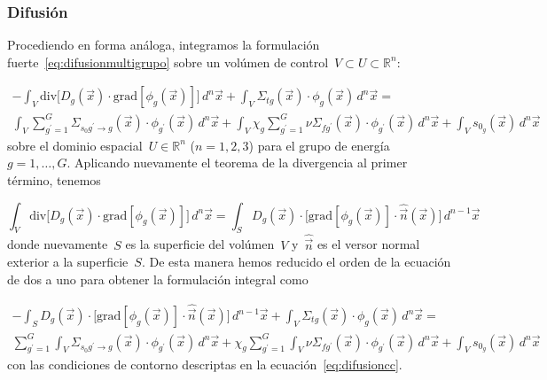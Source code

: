 \subsubsection{Difusión} %

Procediendo en forma análoga, integramos la formulación fuerte~\eqref{eq:difusionmultigrupo} sobre un volúmen de control~$V \subset U \subset \mathbb{R}^n$:

\begin{multline*}
 - \int_V \text{div} \Big[ D_g(\vec{x}) \cdot \text{grad} \left[ \phi_g(\vec{x}) \right] \Big] \, d^n \vec{x}
 + \int_V \Sigma_{t g}(\vec{x}) \cdot \phi_g(\vec{x}) \, d^n \vec{x}
 = \\
 \int_V \sum_{g^\prime = 1}^G \Sigma_{s_0 g^\prime \rightarrow g}(\vec{x})  \cdot \phi_{g^\prime}(\vec{x}) \, d^n \vec{x}
+
 \int_V \chi_g \sum_{g^\prime = 1}^G \nu\Sigma_{fg^\prime}(\vec{x}) \cdot \phi_{g^\prime}(\vec{x}) \, d^n \vec{x}
 +
\int_V s_{0_g}(\vec{x}) \, d^n \vec{x}
\end{multline*}
%
sobre el dominio espacial~$U \in \mathbb{R}^n$ ($n=1,2,3$) para el grupo de energía~$g=1,\dots,G$. Aplicando nuevamente el teorema de la divergencia al primer término, tenemos

\begin{equation*}
\int_V \text{div} \Big[ D_g(\vec{x}) \cdot \text{grad} \left[ \phi_g(\vec{x}) \right] \Big] \, d^n \vec{x} =
\int_S D_g(\vec{x}) \cdot \Big[ \text{grad} \left[ \phi_g(\vec{x}) \right] \cdot \hat{\vec{n}}(\vec{x}) \Big] \, d^{n-1} \vec{x}
\end{equation*}
%
donde nuevamente~$S$ es la superficie del volúmen~$V$ y~$\hat{\vec{n}}$ es el versor normal exterior a la superficie~$S$. De esta manera hemos reducido el orden de la ecuación de dos a uno para obtener la formulación integral como

\begin{multline}\label{eq:difusionintegral}
 - \int_S D_g(\vec{x}) \cdot \Big[ \text{grad} \left[ \phi_g(\vec{x}) \right] \cdot \hat{\vec{n}}(\vec{x}) \Big] \, d^{n-1} \vec{x}
 + \int_V \Sigma_{t g}(\vec{x}) \cdot \phi_g(\vec{x}) \, d^n \vec{x}
 = \\
 \sum_{g^\prime = 1}^G \int_V \Sigma_{s_0 g^\prime \rightarrow g}(\vec{x})  \cdot \phi_{g^\prime}(\vec{x}) \, d^n \vec{x}
+
 \chi_g \sum_{g^\prime = 1}^G \int_V  \nu\Sigma_{fg^\prime}(\vec{x}) \cdot \phi_{g^\prime}(\vec{x}) \, d^n \vec{x}
 +
\int_V s_{0_g}(\vec{x}) \, d^n \vec{x}
\end{multline}
%
con las condiciones de contorno descriptas en la ecuación~\eqref{eq:difusioncc}.

